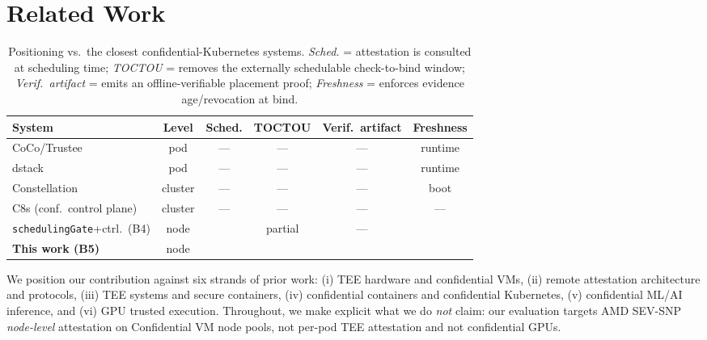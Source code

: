 \section{Related Work}
\label{sec:related}

\begin{table}[t]
  \centering
  \caption{Positioning vs.\ the closest confidential-Kubernetes systems.
  \emph{Sched.} = attestation is consulted at scheduling time; \emph{TOCTOU} =
  removes the externally schedulable check-to-bind window; \emph{Verif.\
  artifact} = emits an offline-verifiable placement proof; \emph{Freshness} =
  enforces evidence age/revocation at bind.}
  \label{tab:related}
  \footnotesize
  \begin{tabular}{@{}lccccc@{}}
    \toprule
    System & Level & Sched. & TOCTOU & Verif.\ artifact & Freshness \\
    \midrule
    CoCo/Trustee~\cite{coco2024} & pod & --- & --- & --- & runtime \\
    dstack~\cite{yang2026dstack} & pod & --- & --- & --- & runtime \\
    Constellation & cluster & --- & --- & --- & boot \\
    C8s (conf.\ control plane) & cluster & --- & --- & --- & --- \\
    \texttt{schedulingGate}+ctrl.\ (B4) & node & \checkmark & partial & --- & \checkmark \\
    \textbf{This work (B5)} & node & \checkmark & \checkmark & \checkmark & \checkmark \\
    \bottomrule
  \end{tabular}
\end{table}

We position our contribution against six strands of prior work: (i) TEE hardware
and confidential VMs, (ii) remote attestation architecture and protocols,
(iii) TEE systems and secure containers, (iv) confidential containers and
confidential Kubernetes, (v) confidential ML/AI inference, and (vi) GPU trusted
execution. Throughout, we make explicit what we do \emph{not} claim: our
evaluation targets AMD SEV-SNP \emph{node-level} attestation on Confidential VM
node pools, not per-pod TEE attestation and not confidential GPUs.

